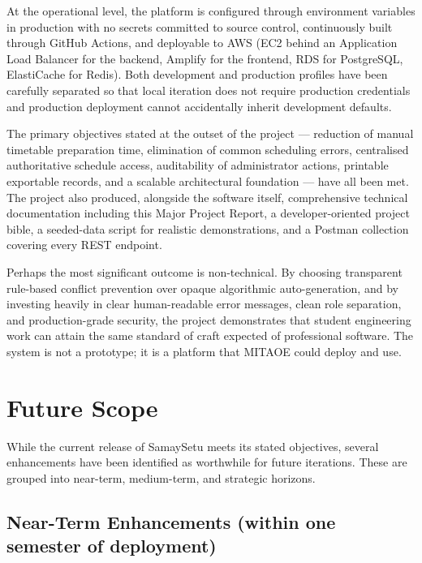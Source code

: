 At the operational level, the platform is configured through environment variables in production with no secrets committed to source control, continuously built through GitHub Actions, and deployable to AWS (EC2 behind an Application Load Balancer for the backend, Amplify for the frontend, RDS for PostgreSQL, ElastiCache for Redis). Both development and production profiles have been carefully separated so that local iteration does not require production credentials and production deployment cannot accidentally inherit development defaults.

The primary objectives stated at the outset of the project --- reduction of manual timetable preparation time, elimination of common scheduling errors, centralised authoritative schedule access, auditability of administrator actions, printable exportable records, and a scalable architectural foundation --- have all been met. The project also produced, alongside the software itself, comprehensive technical documentation including this Major Project Report, a developer-oriented project bible, a seeded-data script for realistic demonstrations, and a Postman collection covering every REST endpoint.

Perhaps the most significant outcome is non-technical. By choosing transparent rule-based conflict prevention over opaque algorithmic auto-generation, and by investing heavily in clear human-readable error messages, clean role separation, and production-grade security, the project demonstrates that student engineering work can attain the same standard of craft expected of professional software. The system is not a prototype; it is a platform that MITAOE could deploy and use.

\section{Future Scope}

While the current release of SamaySetu meets its stated objectives, several enhancements have been identified as worthwhile for future iterations. These are grouped into near-term, medium-term, and strategic horizons.

\subsection{Near-Term Enhancements (within one semester of deployment)}

